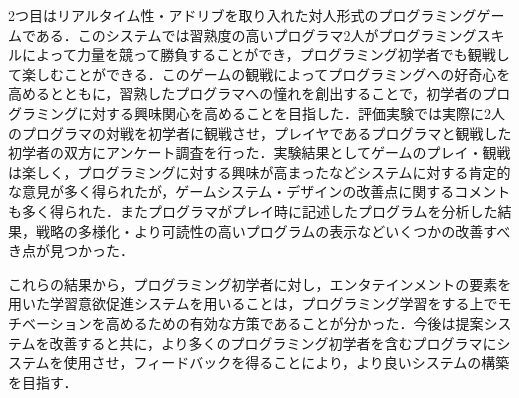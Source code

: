 2つ目はリアルタイム性・アドリブを取り入れた対人形式のプログラミングゲームである．このシステムでは習熟度の高いプログラマ2人がプログラミングスキルによって力量を競って勝負することができ，プログラミング初学者でも観戦して楽しむことができる．このゲームの観戦によってプログラミングへの好奇心を高めるとともに，習熟したプログラマへの憧れを創出することで，初学者のプログラミングに対する興味関心を高めることを目指した．評価実験では実際に2人のプログラマの対戦を初学者に観戦させ，プレイヤであるプログラマと観戦した初学者の双方にアンケート調査を行った．実験結果としてゲームのプレイ・観戦は楽しく，プログラミングに対する興味が高まったなどシステムに対する肯定的な意見が多く得られたが，ゲームシステム・デザインの改善点に関するコメントも多く得られた．またプログラマがプレイ時に記述したプログラムを分析した結果，戦略の多様化・より可読性の高いプログラムの表示などいくつかの改善すべき点が見つかった．


これらの結果から，プログラミング初学者に対し，エンタテインメントの要素を用いた学習意欲促進システムを用いることは，プログラミング学習をする上でモチベーションを高めるための有効な方策であることが分かった．今後は提案システムを改善すると共に，より多くのプログラミング初学者を含むプログラマにシステムを使用させ，フィードバックを得ることにより，より良いシステムの構築を目指す．